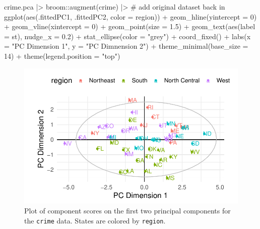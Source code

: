 \documentclass[
  letterpaper,
  10pt,
  krantz2]{krantz}
\makeatletter
\newenvironment{Shaded}{\begin{snugshade}}{\end{snugshade}}
\newcommand{\AttributeTok}[1]{\textcolor[rgb]{0.40,0.45,0.13}{#1}}
\newcommand{\CommentTok}[1]{\textcolor[rgb]{0.37,0.37,0.37}{#1}}
\newcommand{\DecValTok}[1]{\textcolor[rgb]{0.68,0.00,0.00}{#1}}
\newcommand{\FloatTok}[1]{\textcolor[rgb]{0.68,0.00,0.00}{#1}}
\newcommand{\FunctionTok}[1]{\textcolor[rgb]{0.28,0.35,0.67}{#1}}
\newcommand{\NormalTok}[1]{\textcolor[rgb]{0.00,0.23,0.31}{#1}}
\newcommand{\SpecialCharTok}[1]{\textcolor[rgb]{0.37,0.37,0.37}{#1}}
\newcommand{\StringTok}[1]{\textcolor[rgb]{0.13,0.47,0.30}{#1}}
\newenvironment{kframe}{%
  \medskip{}
  \setlength{\fboxsep}{.8em}
  \def\at@end@of@kframe{}%
  \ifinner\ifhmode%
  \def\at@end@of@kframe{\end{minipage}}%
  \begin{minipage}{\columnwidth}%
  \fi\fi%
  \def\FrameCommand##1{\hskip\@totalleftmargin \hskip-\fboxsep
  \colorbox{shadecolor}{##1}\hskip-\fboxsep
      \hskip-\linewidth \hskip-\@totalleftmargin \hskip\columnwidth}%
  \MakeFramed {\advance\hsize-\width
    \@totalleftmargin\z@ \linewidth\hsize
    \@setminipage}}%
{\par\unskip\endMakeFramed%
  \at@end@of@kframe}
\renewenvironment{Shaded}{\begin{kframe}}{\end{kframe}}
\makeatother
\begin{document}
\begin{Shaded}
\begin{Highlighting}[]
\NormalTok{crime.pca }\SpecialCharTok{|\textgreater{}}
\NormalTok{  broom}\SpecialCharTok{::}\FunctionTok{augment}\NormalTok{(crime) }\SpecialCharTok{|\textgreater{}} \CommentTok{\# add original dataset back in}
  \FunctionTok{ggplot}\NormalTok{(}\FunctionTok{aes}\NormalTok{(.fittedPC1, .fittedPC2, }\AttributeTok{color =}\NormalTok{ region)) }\SpecialCharTok{+} 
  \FunctionTok{geom\_hline}\NormalTok{(}\AttributeTok{yintercept =} \DecValTok{0}\NormalTok{) }\SpecialCharTok{+}
  \FunctionTok{geom\_vline}\NormalTok{(}\AttributeTok{xintercept =} \DecValTok{0}\NormalTok{) }\SpecialCharTok{+}
  \FunctionTok{geom\_point}\NormalTok{(}\AttributeTok{size =} \FloatTok{1.5}\NormalTok{) }\SpecialCharTok{+}
  \FunctionTok{geom\_text}\NormalTok{(}\FunctionTok{aes}\NormalTok{(}\AttributeTok{label =}\NormalTok{ st), }\AttributeTok{nudge\_x =} \FloatTok{0.2}\NormalTok{) }\SpecialCharTok{+}
  \FunctionTok{stat\_ellipse}\NormalTok{(}\AttributeTok{color =} \StringTok{"grey"}\NormalTok{) }\SpecialCharTok{+}
  \FunctionTok{coord\_fixed}\NormalTok{() }\SpecialCharTok{+}
  \FunctionTok{labs}\NormalTok{(}\AttributeTok{x =} \StringTok{"PC Dimension 1"}\NormalTok{, }\AttributeTok{y =} \StringTok{"PC Dimnension 2"}\NormalTok{) }\SpecialCharTok{+}
  \FunctionTok{theme\_minimal}\NormalTok{(}\AttributeTok{base\_size =} \DecValTok{14}\NormalTok{) }\SpecialCharTok{+}
  \FunctionTok{theme}\NormalTok{(}\AttributeTok{legend.position =} \StringTok{"top"}\NormalTok{) }
\end{Highlighting}
\end{Shaded}

\begin{figure}[H]

{\centering \includegraphics[width=1\textwidth,height=\textheight]{figs/ch04/fig-crime-scores-plot12-1.pdf}

}

\caption{\label{fig-crime-scores-plot12}Plot of component scores on the
first two principal components for the \texttt{crime} data. States are
colored by \texttt{region}.}

\end{figure}
\end{document}
